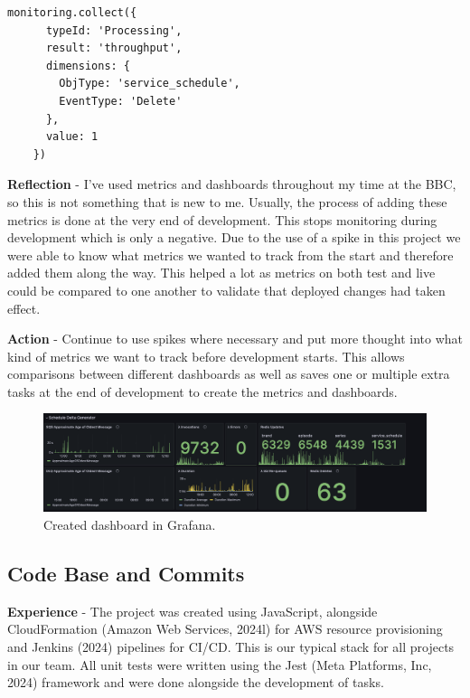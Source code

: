    \begin{lstlisting}[caption=Code used to update a metric\, this variation tracks a schedule delete.]
    monitoring.collect({
      typeId: 'Processing',
      result: 'throughput',
      dimensions: {
        ObjType: 'service_schedule',
        EventType: 'Delete'
      },
      value: 1
    })
  \end{lstlisting}

  \textbf{Reflection} - I've used metrics and dashboards throughout my time at the BBC, so this is not something that is new to me. Usually, the process of 
  adding these metrics is done at the very end of development. This stops monitoring during development which is only a negative. Due to the use of a spike 
  in this project we were able to know what metrics we wanted to track from the start and therefore added them along the way. This helped a lot as metrics on 
  both test and live could be compared to one another to validate that deployed changes had taken effect.
  
  \vspace{0.2cm}
  \textbf{Action} - Continue to use spikes where necessary and put more thought into what kind of metrics we want to track before development starts.
  This allows comparisons between different dashboards as well as saves one or multiple extra tasks at the end of development to create the metrics and
  dashboards.

  \begin{figure}[H]
    \centering
    \includegraphics[width=12cm]{assets/outputs/dashboard.png}
    \caption{Created dashboard in Grafana.}
    \label{fig:dashboard}
  \end{figure}
  
  \newpage
  \subsection{Code Base and Commits}

  \textbf{Experience} - The project was created using JavaScript, alongside CloudFormation (Amazon Web Services, 2024l) for AWS resource provisioning and 
  Jenkins (2024) pipelines for CI/CD. This is our typical stack for all projects in our team. All unit tests were written using the Jest 
  (Meta Platforms, Inc, 2024) framework and were done alongside the development of tasks.

